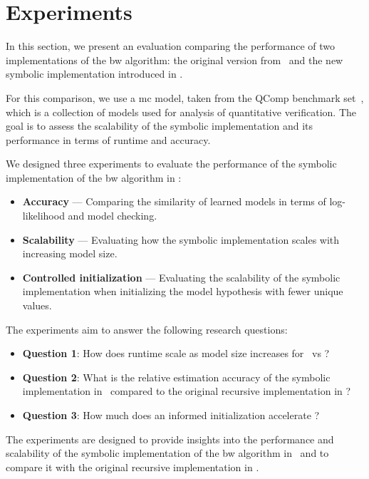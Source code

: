 \section{Experiments}\label{sec:experiments}
In this section, we present an evaluation comparing the performance of two implementations of the \gls{bw} algorithm: the original version from \Jajapy\ and the new symbolic implementation introduced in \Cupaal.

For this comparison, we use a \gls{mc} model, taken from the QComp benchmark set~\cite{hartmanns2019quantitative}, which is a collection of models used for analysis of quantitative verification.
The goal is to assess the scalability of the symbolic implementation and its performance in terms of runtime and accuracy.

We designed three experiments to evaluate the performance of the symbolic implementation of the \gls{bw} algorithm in \Cupaal:

\begin{itemize}
    \item \textbf{Accuracy} — Comparing the similarity of learned models in terms of log-likelihood and model checking.
    \item \textbf{Scalability} — Evaluating how the symbolic implementation scales with increasing model size.
    \item \textbf{Controlled initialization} — Evaluating the scalability of the symbolic implementation when initializing the model hypothesis with fewer unique values.
\end{itemize}

The experiments aim to answer the following research questions:
\begin{itemize}
    \item \textbf{Question 1}: How does runtime scale as model size increases for \Cupaal\ vs \Jajapy?
    \item \textbf{Question 2}: What is the relative estimation accuracy of the symbolic implementation in \Cupaal\ compared to the original recursive implementation in \Jajapy?
    \item \textbf{Question 3}: How much does an informed initialization accelerate \Cupaal?
\end{itemize}


The experiments are designed to provide insights into the performance and scalability of the symbolic implementation of the \gls{bw} algorithm in \Cupaal\ and to compare it with the original recursive implementation in \Jajapy.


